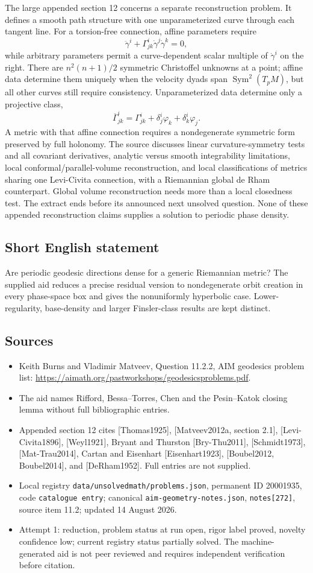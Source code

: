\documentclass[11pt]{article}
\begin{document}
The large appended section 12 concerns a separate reconstruction problem. It defines a smooth path structure with one unparameterized curve through each tangent line. For a torsion-free connection, affine parameters require
\[
\ddot\gamma^i+\Gamma^i_{jk}\dot\gamma^j\dot\gamma^k=0,
\]
while arbitrary parameters permit a curve-dependent scalar multiple of \(\dot\gamma^i\) on the right. There are \(n^2(n+1)/2\) symmetric Christoffel unknowns at a point; affine data determine them uniquely when the velocity dyads span \(\operatorname{Sym}^2(T_pM)\), but all other curves still require consistency. Unparameterized data determine only a projective class,
\[
\overline\Gamma^i_{jk}=\Gamma^i_{jk}+\delta^i_j\varphi_k+\delta^i_k\varphi_j.
\]
A metric with that affine connection requires a nondegenerate symmetric form preserved by full holonomy. The source discusses linear curvature-symmetry tests and all covariant derivatives, analytic versus smooth integrability limitations, local conformal/parallel-volume reconstruction, and local classifications of metrics sharing one Levi-Civita connection, with a Riemannian global de Rham counterpart. Global volume reconstruction needs more than a local closedness test. The extract ends before its announced next unsolved question. None of these appended reconstruction claims supplies a solution to periodic phase density.
\subsection{Short English statement}
Are periodic geodesic directions dense for a generic Riemannian metric? The supplied aid reduces a precise residual version to nondegenerate orbit creation in every phase-space box and gives the nonuniformly hyperbolic case. Lower-regularity, base-density and larger Finsler-class results are kept distinct.
\subsection{Sources}
\begin{itemize}
\item Keith Burns and Vladimir Matveev, Question 11.2.2, AIM geodesics problem list: \url{https://aimath.org/pastworkshops/geodesicsproblems.pdf}.
\item The aid names Rifford, Bessa--Torres, Chen and the Pesin--Katok closing lemma without full bibliographic entries.
\item Appended section 12 cites [Thomas1925], [Matveev2012a, section 2.1], [Levi-Civita1896], [Weyl1921], Bryant and Thurston [Bry-Thu2011], [Schmidt1973], [Mat-Trau2014], Cartan and Eisenhart [Eisenhart1923], [Boubel2012, Boubel2014], and [DeRham1952]. Full entries are not supplied.
\item Local registry \texttt{data/unsolvedmath/problems.json}, permanent ID 20001935, code \texttt{catalogue entry}; canonical \texttt{aim-geometry-notes.json}, \texttt{notes[272]}, source item 11.2; updated 14 August 2026.
\item Attempt 1: reduction, problem status at run open, rigor label proved, novelty confidence low; current registry status partially solved. The machine-generated aid is not peer reviewed and requires independent verification before citation.
\end{itemize}
\end{document}
